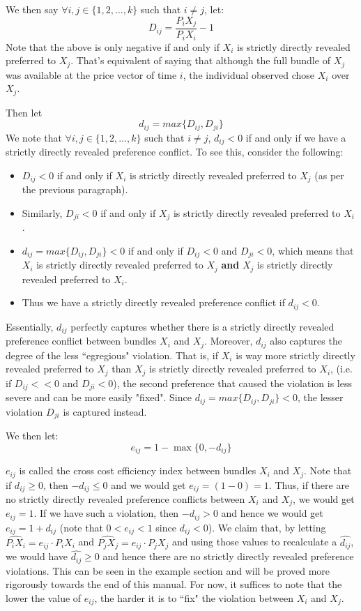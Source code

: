 \documentclass{article} %
\begin{document}
We then say $\forall i,j\in\{1,2,\ldots,k\}$ such that $i\not=j$, let:
    $$D_{ij}=\frac{P_{i}X_{j}}{P_{i}X_{i}}-1$$
Note that the above is only negative if and only if $X_{i}$ is strictly directly revealed preferred to $X_{j}$. That's equivalent of saying that although the full bundle of $X_{j}$ was available at the price vector of time $i$, the individual observed chose $X_{i}$ over $X_{j}$.


Then let
$$d_{ij}=max\{D_{ij}, D_{ji}\}$$
We note that $\forall i,j\in\{1,2,\ldots,k\}$ such that $i\not=j$, $d_{ij}<0$ if and only if we have a strictly directly revealed preference conflict. To see this, consider the following:

\begin{itemize}
    \item $D_{ij}<0$ if and only if $X_{i}$ is strictly directly revealed preferred to $X_{j}$ (as per the previous paragraph). 
    \item Similarly, $D_{ji}<0$ if and only if $X_{j}$ is strictly directly revealed preferred to $X_{i}$.
    \item $d_{ij}=max\{D_{ij}, D_{ji}\}<0$ if and only if $D_{ij}<0$ and $D_{ji}<0$, which means that $X_{i}$ is strictly directly revealed preferred to $X_{j}$ \textbf{and} $X_{j}$ is strictly directly revealed preferred to $X_{i}$. 
    \item Thus we have a strictly directly revealed preference conflict if $d_{ij} < 0$.
\end{itemize}

Essentially, $d_{ij}$ perfectly captures whether there is a strictly directly revealed preference conflict between bundles $X_{i}$ and $X_{j}$. Moreover, $d_{ij}$ also captures the degree of the less ``egregious" violation. That is, if $X_{i}$ is way more strictly directly revealed preferred to $X_{j}$ than $X_{j}$ is strictly directly revealed preferred to $X_{i}$, (i.e. if $D_{ij}<<0$ and $D_{ji}<0$), the second preference that caused the violation is less severe and can be more easily "fixed". Since $d_{ij}=max\{D_{ij}, D_{ji}\}<0$, the lesser violation $D_{ji}$ is captured instead.

We then let:
$$
e_{ij}=1-\max\{0,-d_{ij}\}
$$

$e_{ij}$ is called the cross cost efficiency index between bundles $X_{i}$ and $X_{j}$. Note that if $d_{ij}\geq0$, then $-d_{ij}\leq0$ and we would get $e_{ij}=(1-0)=1$. Thus, if there are no strictly directly revealed preference conflicts between $X_{i}$ and $X_{j}$, we would get $e_{ij}=1$. If we have such a violation, then $-d_{ij}>0$ and hence we would get $e_{ij}=1+d_{ij}$ (note that $0<e_{ij}<1$ since $d_{ij}<0$). We claim that, by letting $\hat{ P_iX_i}=e_{ij}\cdot P_iX_i$ and $\hat{P_jX_j}=e_{ij}\cdot P_jX_j$ and using those values to recalculate a $\hat{d_{ij}}$, we would have $\hat{d_{ij}}\geq0$ and hence there are no strictly directly revealed preference violations. This can be seen in the example section and will be proved more rigorously towards the end of this manual. For now, it suffices to note that the lower the value of $e_{ij}$, the harder it is to ``fix" the violation between $X_{i}$ and $X_{j}$.
\end{document}

